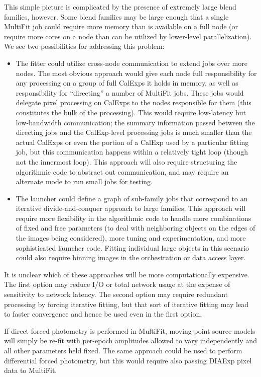 This simple picture is complicated by the presence of extremely large blend families, however.  Some blend families may be large enough that a single MultiFit job could require more memory than is available on a full node (or require more cores on a node than can be utilized by lower-level parallelization).  We see two possibilities for addressing this problem:
\begin{itemize}
\item The fitter could utilize cross-node communication to extend jobs over more nodes.  The most obvious approach would give each node full responsibility for any processing on a group of full CalExps it holds in memory, as well as responsibility for ``directing'' a number of MultiFit jobs.  These jobs would delegate pixel processing on CalExps to the nodes responsible for them (this constitutes the bulk of the processing).  This would require low-latency but low-bandwidth communication; the summary information passed between the directing jobs and the CalExp-level processing jobs is much smaller than the actual CalExps or even the portion of a CalExp used by a particular fitting job, but this communication happens within a relatively tight loop (though not the innermost loop).  This approach will also require structuring the algorithmic code to abstract out communication, and may require an alternate mode to run small jobs for testing.
\item The launcher could define a graph of sub-family jobs that correspond to an iterative divide-and-conquer approach to large families.  This approach will require more flexibility in the algorithmic code to handle more combinations of fixed and free parameters (to deal with neighboring objects on the edges of the images being considered), more tuning and experimentation, and more sophisticated launcher code.  Fitting individual large objects in this scenario could also require binning images in the orchestration or data access layer.
\end{itemize}
It is unclear which of these approaches will be more computationally expensive.  The first option may reduce I/O or total network usage at the expense of sensitivity to network latency.  The second option may require redundant processing by forcing iterative fitting, but that sort of iterative fitting may lead to faster convergence and hence be used even in the first option.

If direct forced photometry is performed in MultiFit, moving-point source models will simply be re-fit with per-epoch amplitudes allowed to vary independently and all other parameters held fixed.  The same approach could be used to perform differential forced photometry, but this would require also passing DIAExp pixel data to MultiFit.

